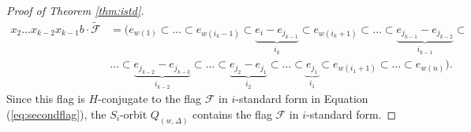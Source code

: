 \documentclass[12pt]{amsart}
\numberwithin{equation}{section}
\theoremstyle{remark}
\theoremstyle{definition}
\newcommand{\B}{\mathcal{B}}
\newcommand{\F}{\mathcal{F}}
\begin{document}
\begin{proof}[Proof of Theorem \ref{thm:istd}]
\begin{equation*}
\begin{split}
x_{2}\dots x_{k-2}x_{k-1}b\cdot\tilde{\F}&=(e_{w(1)}\subset\dots\subset e_{w(i_{k}-1)}\subset\underbrace{ e_{i}-e_{j_{k-1}}}_{i_{k}}\subset e_{w(i_{k}+1)}\subset \dots \subset \underbrace{e_{j_{k-1}}-e_{j_{k-2}}}_{i_{k-1}}\subset\\
&\dots\subset\underbrace{e_{j_{k-2}}-e_{j_{k-3}}}_{i_{k-2}}\subset  \dots \subset \underbrace{e_{j_{2}}-e_{j_{1}}}_{i_{2}}\subset \dots\subset \underbrace{e_{j_{1}}}_{i_{1}}
\subset e_{w(i_{1}+1)}\subset \dots\subset e_{w(n)}).
\end{split}
\end{equation*}
Since this flag is $H$-conjugate to the flag $\F$ in $i$-standard form in Equation (\ref{eq:secondflag}), the $S_{i}$-orbit $Q_{(w,\Delta)}$ contains the flag $\F$ in $i$-standard form.



\end{proof}
\end{document}
